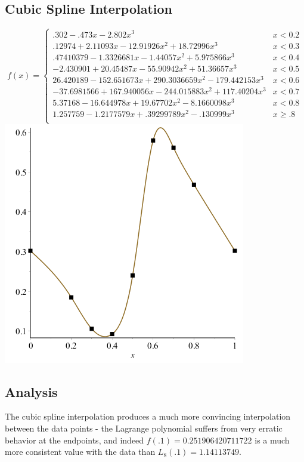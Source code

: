 \documentclass[11pt]{article} %
\begin{document}
\subsection*{Cubic Spline Interpolation}
$$
f(x) = \left\{
        \begin{array}{ll}
            .302 - .473x - 2.802x^3 &  x < 0.2 \\
            .12974+2.11093x-12.91926x^2+18.72996x^3 & x < 0.3 \\
 	.47410379-1.3326681x-1.44057x^2+5.975866x^3 & x < 0.4 \\
 	-2.430901+20.45487x-55.90942x^2+51.36657x^3 &  x < 0.5 \\
 	26.420189-152.651673x+290.3036659x^2-179.442153x^3 &  x < 0.6 \\
 	-37.6981566+167.940056x-244.015883x^2+117.40204x^3 & x < 0.7 \\
 	5.37168-16.644978x+19.67702x^2-8.1660098x^3 & x < 0.8 \\
 	1.257759-1.2177579x+.39299789x^2-.130999x^3 &  x \geq .8 \\
        \end{array}
    \right.
$$
\includegraphics[scale=.5]{plots/problem7plot2.png}

\subsection*{Analysis}
The cubic spline interpolation produces a much more convincing interpolation between the data points - the Lagrange polynomial suffers from very erratic behavior
at the endpoints, and indeed $f(.1) = 0.251906420711722$ is a much more consistent value with the data than $L_8(.1) = 1.14113749$. 
\end{document}
